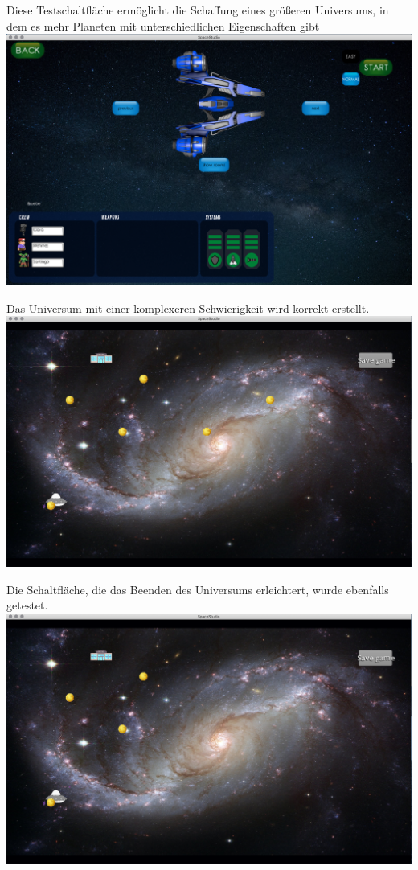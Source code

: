 \documentclass[11pt]{article}
\begin{document}
Diese Testschaltfläche ermöglicht die Schaffung eines größeren Universums, in dem es mehr Planeten mit unterschiedlichen Eigenschaften gibt\\
\includegraphics[scale=0.2]{TestProtocolBilder/universeButon.png}

Das Universum mit einer komplexeren Schwierigkeit wird korrekt erstellt.\\
\includegraphics[scale=0.2]{TestProtocolBilder/universeHard.png}

Die Schaltfläche, die das Beenden des Universums erleichtert, wurde ebenfalls getestet.\\
\includegraphics[scale=0.2]{TestProtocolBilder/universeEase.png}
\end{document}
